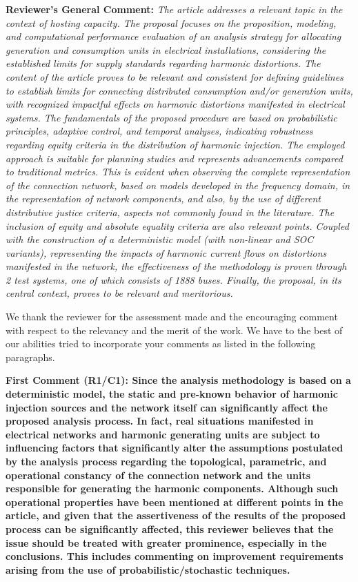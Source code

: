 \documentclass[10pt]{article}
\begin{document}
\textbf{Reviewer's General Comment:} \newline \textit{The article addresses a relevant topic in the context of hosting capacity. The proposal focuses on the proposition, modeling, and computational performance evaluation of an analysis strategy for allocating generation and consumption units in electrical installations, considering the established limits for supply standards regarding harmonic distortions. The content of the article proves to be relevant and consistent for defining guidelines to establish limits for connecting distributed consumption and/or generation units, with recognized impactful effects on harmonic distortions manifested in electrical systems. The fundamentals of the proposed procedure are based on probabilistic principles, adaptive control, and temporal analyses, indicating robustness regarding equity criteria in the distribution of harmonic injection. The employed approach is suitable for planning studies and represents advancements compared to traditional metrics. This is evident when observing the complete representation of the connection network, based on models developed in the frequency domain, in the representation of network components, and also, by the use of different distributive justice criteria, aspects not commonly found in the literature. The inclusion of equity and absolute equality criteria are also relevant points. Coupled with the construction of a deterministic model (with non-linear and SOC variants), representing the impacts of harmonic current flows on distortions manifested in the network, the effectiveness of the methodology is proven through 2 test systems, one of which consists of 1888 buses. Finally, the proposal, in its central context, proves to be relevant and meritorious.}

\begin{tcolorbox}[colback=black!5!white,colframe=black]
We thank the reviewer for the assessment made and the encouraging comment with respect to the relevancy and the merit of the work.  We have to the best of our abilities tried to incorporate your comments as listed in the following paragraphs.
\end{tcolorbox}

\textbf{First Comment (R1/C1): Since the analysis methodology is based on a deterministic model, the static and pre-known behavior of harmonic injection sources and the network itself can significantly affect the proposed analysis process. In fact, real situations manifested in electrical networks and harmonic generating units are subject to influencing factors that significantly alter the assumptions postulated by the analysis process regarding the topological, parametric, and operational constancy of the connection network and the units responsible for generating the harmonic components. Although such operational properties have been mentioned at different points in the article, and given that the assertiveness of the results of the proposed process can be significantly affected, this reviewer believes that the issue should be treated with greater prominence, especially in the conclusions. This includes commenting on improvement requirements arising from the use of probabilistic/stochastic techniques.}
\end{document}
